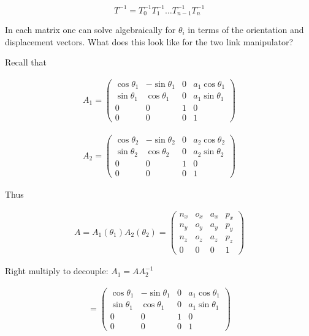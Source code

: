 \[T^{-1}
  = T_0^{-1} T_{1}^{-1} \dots T_{n-1}^{-1} T_n^{-1}\]

In each matrix one can solve algebraically for \(\theta_i\) in terms of
the orientation and displacement vectors. What does this look like for
the two link manipulator?

Recall that

\[\begin{aligned}
A_1 =\begin{pmatrix}\cos \theta_1 & -\sin \theta_1 & 0 & a_1 \cos \theta_1 \\
         \sin \theta_1 & \cos \theta_1 & 0 & a_1 \sin \theta_1
        \\ 0 &0 & 1 & 0 \\
         0& 0& 0& 1 \end{pmatrix}
\end{aligned}\]

\[\begin{aligned}
A_2 =\begin{pmatrix}\cos \theta_2 & -\sin \theta_2 & 0 & a_2 \cos \theta_2 \\
         \sin \theta_2 & \cos \theta_2 & 0 & a_2 \sin \theta_2 \\ 0 &0 & 1 & 0 \\
         0& 0& 0& 1 \end{pmatrix}
\end{aligned}\]

Thus

\[\begin{aligned}
A = A_1(\theta_1)A_2(\theta_2) = \begin{pmatrix}
         n_x & o_x & a_x & p_x \\
         n_y & o_y & a_y & p_y\\
         n_z & o_z & a_z & p_z \\ 0 & 0 & 0 & 1\end{pmatrix}
\end{aligned}\]

Right multiply to decouple: \(A_1 = A A_2^{-1}\)

\[\begin{aligned}
=\begin{pmatrix}\cos \theta_1 & -\sin \theta_1 & 0 & a_1 \cos \theta_1 \\
         \sin \theta_1 & \cos \theta_1 & 0 & a_1 \sin \theta_1
        \\ 0 &0 & 1 & 0 \\
         0& 0& 0& 1 \end{pmatrix}
\end{aligned}\]

